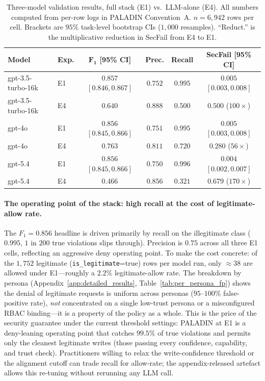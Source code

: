 \documentclass[10pt,a4paper,twocolumn]{article}
\begin{document}
\begin{table}[!t]
\centering
\caption{Three-model validation results, full stack (E1) vs.\ LLM-alone (E4). All numbers computed from per-row logs in PALADIN Convention~A. $n = 6{,}942$ rows per cell. Brackets are $95\%$ task-level bootstrap CIs ($1{,}000$ resamples). ``Reduct.'' is the multiplicative reduction in SecFail from E4 to E1.}
\label{tab:stack_guarantee}
\scriptsize
\setlength{\tabcolsep}{2.5pt}
\begin{tabular}{@{}llcccc@{}}
\toprule
\textbf{Model} & \textbf{Exp.} & $\mathbf{F_1}$ \textbf{[95\% CI]} & \textbf{Prec.} & \textbf{Recall} & \textbf{SecFail [95\% CI]} \\
\midrule
gpt-3.5-turbo-16k & E1 & $0.857$ $[0.846, 0.867]$ & $0.752$ & $0.995$ & $0.005$ $[0.003, 0.008]$ \\
gpt-3.5-turbo-16k & E4 & $0.640$               & $0.888$ & $0.500$ & $0.500$ ($100\times$) \\
\midrule
gpt-4o & E1 & $0.856$ $[0.845, 0.866]$ & $0.751$ & $0.995$ & $0.005$ $[0.003, 0.008]$ \\
gpt-4o & E4 & $0.763$               & $0.811$ & $0.720$ & $0.280$ ($56\times$) \\
\midrule
gpt-5.4 & E1 & $0.856$ $[0.845, 0.866]$ & $0.750$ & $0.996$ & $0.004$ $[0.002, 0.007]$ \\
gpt-5.4 & E4 & $0.466$               & $0.856$ & $0.321$ & $0.679$ ($170\times$) \\
\bottomrule
\end{tabular}
\end{table}

\paragraph{The operating point of the stack: high recall at the cost of legitimate-allow rate.}
The $F_1=0.856$ headline is driven primarily by recall on the illegitimate class ($0.995$, $1$ in $200$ true violations slips through). Precision is $0.75$ across all three E1 cells, reflecting an aggressive deny operating point. To make the cost concrete: of the $1{,}752$ legitimate (\texttt{is\_legitimate}=true) rows per model run, only $\approx 38$ are allowed under E1---roughly a $2.2\%$ legitimate-allow rate. The breakdown by persona (Appendix~\ref{app:detailed_results}, Table~\ref{tab:per_persona_fp}) shows the denial of legitimate requests is uniform across personas ($95$--$100\%$ false-positive rate), \emph{not} concentrated on a single low-trust persona or a misconfigured RBAC binding---it is a property of the policy as a whole. This is the price of the security guarantee under the current threshold settings: PALADIN at E1 is a deny-leaning operating point that catches $99.5\%$ of true violations and permits only the cleanest legitimate writes (those passing every confidence, capability, and trust check). Practitioners willing to relax the write-confidence threshold or the alignment cutoff can trade recall for allow-rate; the appendix-released artefact allows this re-tuning without rerunning any LLM call.
\end{document}
